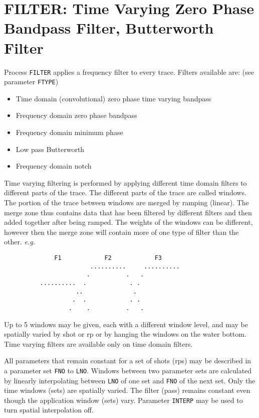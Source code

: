 \section{FILTER: Time Varying Zero Phase Bandpass Filter, Butterworth Filter}
\label{cmd_filter}

Process \texttt{FILTER} applies a frequency filter to every trace.  Filters
available are: (see parameter \texttt{FTYPE})
\begin{itemize}
\item Time domain (convolutional) zero phase time varying bandpass
\item Frequency domain zero phase bandpass
\item Frequency domain minimum phase
\item Low pass Butterworth
\item Frequency domain notch
\end{itemize}

Time varying filtering is performed by applying different time domain
filters to different parts of the trace.  The different parts of the
trace are called windows.  The portion of the trace between windows
are merged by ramping (linear).  The merge zone thus contains data that
has been filtered by different filters and then added together after
being ramped.  The weights of the windows can be different, however then
the merge zone will contain more of one type of filter than the other.
\textit{e.g.}
\begin{verbatim}
              F1            F2            F3
                        ..........     ..........
                       .          .   .
          ..........  .            . .
                    ..              .
                   .  .            . .
                  .    .          .   .
\end{verbatim}

Up to 5 windows may be given, each with a different window level, and
may be spatially varied by \gls{shot} or \gls{rp} or by hanging the windows on the
water bottom.  Time varying filters are available only on time domain
filters.

All parameters that remain constant for a set of \glspl{shot} (\glspl{rp}) may be
described in a parameter set \texttt{FNO} to \texttt{LNO}.  Windows between two parameter
sets are calculated by linearly interpolating between \texttt{LNO} of one set
and \texttt{FNO} of the next set.  Only the time windows (sets) are spatially
varied.  The filter (pass) remains constant even though the application
window (sets) vary.  Parameter \texttt{INTERP} may be used to turn spatial
interpolation off.

